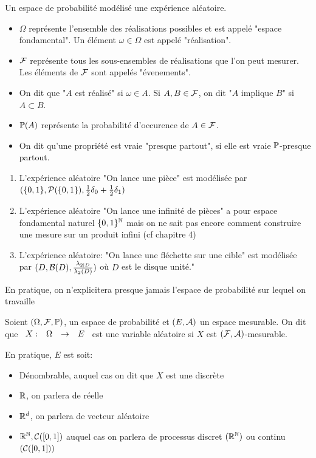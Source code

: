 \documentclass[]{report}
\begin{document}
    Un espace de probabilité modélisé une expérience aléatoire.
    
    \begin{itemize}
        \item $\Omega$ représente l'ensemble des réalisations possibles et est appelé "espace fondamental". Un élément $\omega\in\Omega$ est appelé "réalisation".
        \item $\mathcal{F}$ représente tous les sous-ensembles de réalisations que l'on peut mesurer. Les éléments de $\mathcal{F}$ sont appelés "évenements".
        \item On dit que "$A$ est réalisé" si $\omega\in A$. Si $A,B\in\mathcal{F}$, on dit "$A$ implique $B$" si $A\subset B$.
        \item $\mathbb{P}(A)$ représente la probabilité d'occurence de $A\in\mathcal{F}$.
        \item On dit qu'une propriété est vraie "presque partout", si elle est vraie $\mathbb{P}$-presque partout.
    \end{itemize}

    \begin{ex}{}{}
        \begin{enumerate}
            \item L'expérience aléatoire "On lance une pièce" est modélisée par $(\{0,1\},\mathcal{P}(\{0,1\}),\frac{1}{2}\delta_0+\frac{1}{2}\delta_1)$
            \item L'expérience aléatoire "On lance une infinité de pièces" a pour espace fondamental naturel $\{0,1\}^{\mathbb{N}}$ mais on ne sait pas encore comment construire une mesure sur un produit infini (cf chapitre 4)
            \item L'expérience aléatoire: "On lance une fléchette sur une cible" est modélisée par $(D,\mathcal{B}(D),\frac{\lambda_{2|D}}{\lambda_2(D)})$ où $D$ est le disque unité."
        \end{enumerate}
    \end{ex}

    En pratique, on n'explicitera presque jamais l'espace de probabilité sur lequel on travaille

    \begin{df}{}{}
        Soient $(\Omega,\mathcal{F},\mathbb{P})$, un espace de probabilité et $(E,\mathcal{A})$ un espace mesurable. On dit que $\begin{array}{ccccc} X : & \Omega & \to & E \end{array}$ est une variable aléatoire si $X$ est $(\mathcal{F},\mathcal{A})$-mesurable.
    \end{df}

    \begin{re}{}{}
        En pratique, $E$ est soit:
        \begin{itemize}
            \item Dénombrable, auquel cas on dit que $X$ est une \va discrète
            \item $\mathbb{R}$, on parlera de \va réelle
            \item $\mathbb{R}^d$, on parlera de vecteur aléatoire
            \item $\mathbb{R}^{\mathbb{N}},\mathcal{C}([0,1])$ auquel cas on parlera de processus discret $(\mathbb{R}^{\mathbb{N}})$ ou continu $(\mathcal{C}([0,1]))$
        \end{itemize}
    \end{re}
\end{document}
